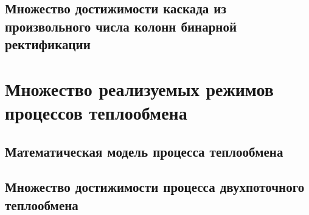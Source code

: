 \documentclass{article}
\begin{document}
	\subsection{Множество достижимости каскада из произвольного числа колонн бинарной ректификации}

\section{Множество реализуемых режимов процессов теплообмена}
	\subsection{Математическая модель процесса теплообмена}
	
	\subsection{Множество достижимости процесса двухпоточного теплообмена}
	
\end{document}
